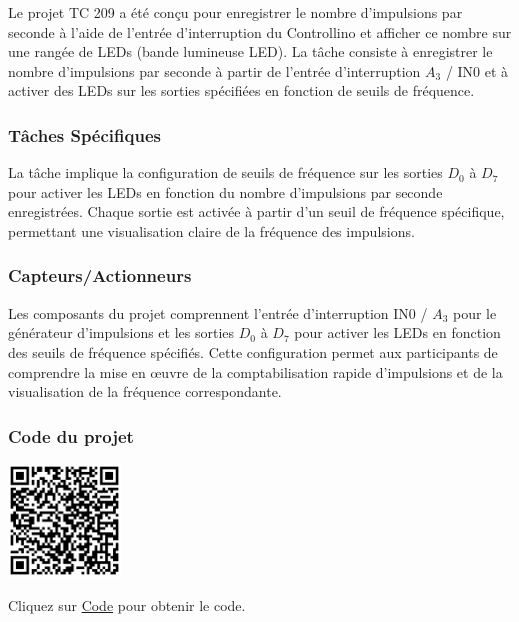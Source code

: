 \documentclass[a4paper,12pt]{report}
\begin{document}
Le projet TC 209 a été conçu pour enregistrer le nombre d'impulsions par seconde à l'aide de l'entrée d'interruption du Controllino et afficher ce nombre sur une rangée de LEDs (bande lumineuse LED). La tâche consiste à enregistrer le nombre d'impulsions par seconde à partir de l'entrée d'interruption \(A_3\) / IN0 et à activer des LEDs sur les sorties spécifiées en fonction de seuils de fréquence.

\subsubsection{Tâches Spécifiques}

La tâche implique la configuration de seuils de fréquence sur les sorties \(D_0\) à \(D_7\) pour activer les LEDs en fonction du nombre d'impulsions par seconde enregistrées. Chaque sortie est activée à partir d'un seuil de fréquence spécifique, permettant une visualisation claire de la fréquence des impulsions.

\subsubsection{Capteurs/Actionneurs}

Les composants du projet comprennent l'entrée d'interruption IN0 / \(A_3\) pour le générateur d'impulsions et les sorties \(D_0\) à \(D_7\) pour activer les LEDs en fonction des seuils de fréquence spécifiés. Cette configuration permet aux participants de comprendre la mise en œuvre de la comptabilisation rapide d'impulsions et de la visualisation de la fréquence correspondante.

\subsubsection{Code du projet}

\begin{minipage}{0.5\textwidth}
    \includegraphics[height=3cm]{Code TC209.png}
\end{minipage}%
\begin{minipage}{0.5\textwidth}
    Cliquez sur \href{https://github.com/DexterTaha/Controllino-PLC-Sample/blob/main/TC200/TC209_Compteur_Rapide/TC209_Compteur_Rapide.ino}{Code} pour obtenir le code.
\end{minipage}
\end{document}
